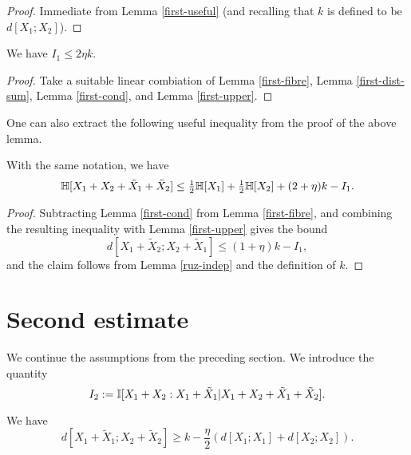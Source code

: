 \begin{proof} \leanok  Immediate from Lemma \ref{first-useful} (and recalling that $k$ is defined to be $d[X_1;X_2]$).
\end{proof}

\begin{lemma}\label{first-estimate}
  \leanok We have $I_1 \leq 2 \eta k$.
\end{lemma}

\begin{proof}\leanok  Take a suitable linear combiation of Lemma \ref{first-fibre}, Lemma \ref{first-dist-sum}, Lemma \ref{first-cond}, and Lemma \ref{first-upper}.
\end{proof}

One can also extract the following useful inequality from the proof of the above lemma.

\begin{lemma}\label{foursum-bound}
  \leanok
  With the same notation, we have
  \begin{equation}
    \label{HS-bound}
    \mathbb{H}[X_1+X_2+\tilde X_1+\tilde X_2] \le \tfrac{1}{2} \mathbb{H}[X_1]+\tfrac{1}{2} \mathbb{H}[X_2] + (2 + \eta) k - I_1.
  \end{equation}
\end{lemma}

\begin{proof}\leanok
  Subtracting Lemma \ref{first-cond} from Lemma \ref{first-fibre}, and combining the resulting inequality with Lemma \ref{first-upper} gives the bound
\[
  d[X_1+\tilde X_2;X_2+\tilde X_1] \le (1 + \eta) k - I_1,
\]
and the claim follows from Lemma \ref{ruz-indep} and the definition of $k$.
\end{proof}


\section{Second estimate}

We continue the assumptions from the preceding section.
We introduce the quantity
$$ I_2 := \mathbb{I}[X_1+X_2 : X_1 + \tilde X_1 | X_1+X_2+\tilde X_1+\tilde X_2].$$

\begin{lemma}\label{dist-sums}
  \leanok
We have
$$ d[X_1+\tilde X_1; X_2+\tilde X_2] \geq k - \frac{\eta}{2} ( d[X_1; X_1] + d[X_2;X_2] ).$$
\end{lemma}

